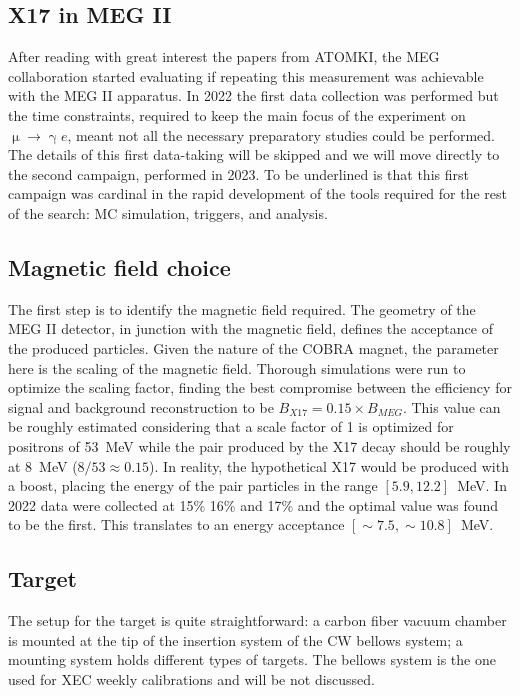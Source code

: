 \begin{refsection}
\section{X17 in MEG II}
    After reading with great interest the papers from ATOMKI, the MEG collaboration started evaluating if repeating this measurement was achievable with the MEG II apparatus.
    In 2022 the first data collection was performed but the time constraints, required to keep the main focus of the experiment on $\upmu \rightarrow \upgamma e$, meant not all the necessary preparatory studies could be performed.
    The details of this first data-taking will be skipped and we will move directly to the second campaign, performed in 2023. 
    To be underlined is that this first campaign was cardinal in the rapid development of the tools required for the rest of the search: MC simulation, triggers, and analysis.\\
        
    \subsection{Magnetic field choice}
        The first step is to identify the magnetic field required. 
        The geometry of the MEG II detector, in junction with the magnetic field, defines the acceptance of the produced particles.
        Given the nature of the COBRA magnet, the parameter here is the scaling of the magnetic field.
        Thorough simulations were run to optimize the scaling factor, finding the best compromise between the efficiency for signal and background reconstruction to be $B_{X17}=0.15\times B_{MEG}$. 
        This value can be roughly estimated considering that a scale factor of 1 is optimized for positrons of \SI{53}{MeV} while the pair produced by the X17 decay should be roughly at \SI{8}{MeV} ($8/53\approx 0.15$). 
        In reality, the hypothetical X17 would be produced with a boost, placing the energy of the pair particles in the range $[5.9,12.2]$~MeV.
        In 2022 data were collected at 15\% 16\% and 17\% and the optimal value was found to be the first.
        This translates to an energy acceptance $[\sim7.5,\sim10.8]$~MeV.
        
    \subsection{Target}
        The setup for the target is quite straightforward: a carbon fiber vacuum chamber is mounted at the tip of the insertion system of the CW bellows system; a mounting system holds different types of targets.
        The bellows system is the one used for XEC weekly calibrations and will be not discussed.
        

\end{refsection}
